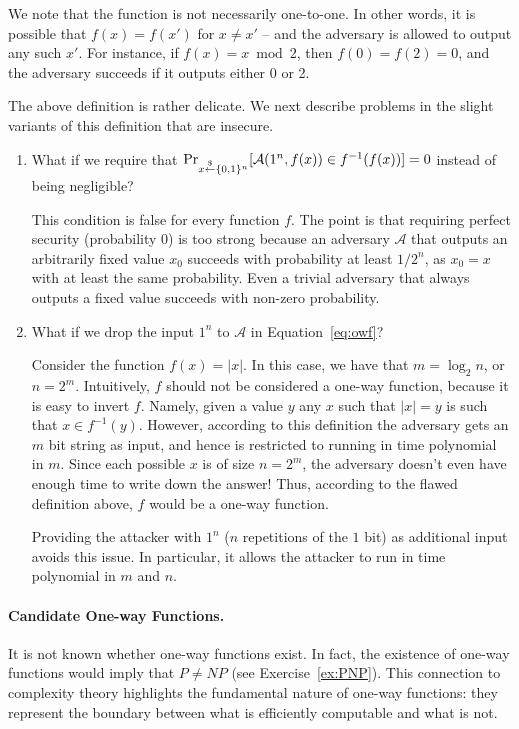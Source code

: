 
We note that the function is not necessarily one-to-one. In other words, it is possible that $f(x) = f(x')$ for $x \neq x'$ -- and the adversary is allowed to output any such $x'$. For instance, if $f(x) = x \bmod 2$, then $f(0) = f(2) = 0$, and the adversary succeeds if it outputs either 0 or 2.

The above definition is rather delicate. We next describe problems in the slight variants of this definition that are insecure.

\begin{enumerate}
\item What if we require that
    $\Pr_{x \stackrel{\$}{\leftarrow} \{0,1\}^{n}}[ \mathcal{A}(1^n, f(x)) \in f^{-1}(f(x))] = 0$ instead of being negligible?

This condition is false for every function $f$. The point is that requiring perfect security (probability $0$) is too strong because an adversary $\mathcal{A}$ that outputs an arbitrarily fixed value $x_0$ succeeds with probability at least $1/2^{n}$, as $x_0 = x$ with at least the same probability. Even a trivial adversary that always outputs a fixed value succeeds with non-zero probability.

\item  What if we drop the input $1^n$ to $\mathcal{A}$ in Equation~\ref{eq:owf}?

Consider the function $f(x) = |x|$.  In this case, we have that $m = \log_2 n$, or $n = 2^m$.  Intuitively, $f$ should not be considered a one-way function, because it is easy to invert $f$. Namely, given a value $y$ any $x$ such that $|x| = y$ is such that $x \in f^{-1}(y)$.  However, according to this definition the adversary gets an $m$ bit string as input, and hence is restricted to running in time polynomial in $m$. Since each possible $x$ is of size $n = 2^m$, the adversary doesn't even have enough time to write down the answer!  Thus, according to the flawed definition above, $f$ would be a one-way function.

Providing the attacker with $1^n$ ($n$ repetitions of the $1$ bit) as additional input avoids this issue.  In particular, it allows the attacker to run in time polynomial in $m$ and $n$.
\end{enumerate}

\paragraph{Candidate One-way Functions.}
It is not known whether one-way functions exist. In fact, the existence of one-way functions would imply that $P \neq NP$ (see Exercise~\ref{ex:PNP}). This connection to complexity theory highlights the fundamental nature of one-way functions: they represent the boundary between what is efficiently computable and what is not. 

